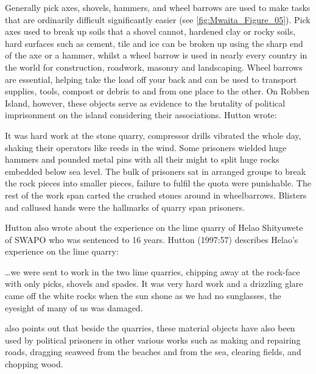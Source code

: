 Generally pick axes, shovels, hammers, and wheel barrows are used to make tasks that are ordinarily difficult significantly easier (see \cref{fig:Mwaita_Figure_05}).
Pick axes used to break up soils that a shovel cannot, hardened clay or rocky soils, hard surfaces such as cement, tile and ice can be broken up using the sharp end of the axe or a hammer, whilst a wheel barrow is used in nearly every country in the world for construction, roadwork, masonry and landscaping. Wheel barrows are essential, helping take the load off your back and can be used to transport supplies, tools, compost or debris to and from one place to the other. On Robben Island, however, these objects serve as evidence to the brutality of political imprisonment on the island considering their associations. Hutton wrote:
\begin{IJSRAquote}{\cite[Michael Dingake in][57]{Hutton_1997}}{It was hard work at the stone quarry, compressor drills vibrated the whole day, shaking their operators like reeds in the wind. Some prisoners wielded huge hammers and pounded metal pins with all their might to split huge rocks embedded below sea level. The bulk of prisoners sat in arranged groups to break the rock pieces into smaller pieces, failure to fulfil the quota were punishable. The rest of the work span carted the crushed stones around in wheelbarrows. Blisters and callused hands were the hallmarks of quarry span prisoners.}
\end{IJSRAquote}
Hutton also wrote about the experience on the lime quarry of Helao Shityuwete of SWAPO who was sentenced to 16 years. Hutton (1997:57) describes Helao’s experience on the lime quarry:
\begin{IJSRAquote}{\cite[57]{Hutton_1997}}
    { …we were sent to work in the two lime quarries, chipping away at the rock-face with only picks, shovels and spades. It was very hard work and a drizzling glare came off the white rocks when the sun shone as we had no sunglasses, the eyesight of many of us was damaged.}
\end{IJSRAquote}

\textcite[76]{Naidoo_1982} also points out that beside the quarries, these material objects have also been used by political prisoners in other various works such as making and repairing roads, dragging seaweed from the beaches and from the sea, clearing fields, and chopping wood.

